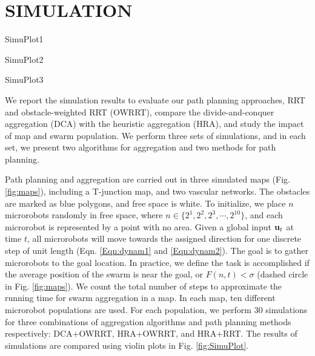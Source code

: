 \section{SIMULATION}\label{Simul}
\begin{figure*}[h] %
	\centering
	\begin{overpic}[width=0.67\columnwidth]{SimuPlot1}\end{overpic}
	\begin{overpic}[width=0.67\columnwidth]{SimuPlot2}\end{overpic}
	\begin{overpic}[width=0.67\columnwidth]{SimuPlot3}\end{overpic}	
	\caption{\label{fig:SimuPlot} Particle aggregation in maps (a,b,c). The violin plot shows the probability density of the simulation data and the black line indicates the mean value. We performed 30 simulations for each combination of methods and swarm populations.}
\end{figure*}
We report the simulation results to evaluate our path planning approaches, RRT and obstacle-weighted RRT (OWRRT), compare the divide-and-conquer aggregation (DCA) with the heuristic aggregation (HRA), and study the impact of map and swarm population. We perform three sets of simulations, and in each set, we present two algorithms for aggregation and two methods for path planning. 






Path planning and aggregation are carried out in three simulated maps (Fig. \ref{fig:maps}), including a T-junction map, and two vascular networks. 
The obstacles are marked as blue polygons, and free space is white. 
To initialize, we place $n$ microrobots randomly in free space, where $n \in \{2^1, 2^2, 2^3, \dotsm, 2^{10}\}$, and each microrobot is represented by a point with no area. 
Given a global input ${\bf u}_t$ at time $t$, all microrobots will move towards the assigned direction for one discrete step of unit length (Eqn. \ref{Eqn:dynam1} and \ref{Eqn:dynam2}). 
The goal is to gather microrobots to the goal location. 
In practice, we define the task is accomplished if the average position of the swarm is near the goal, or $F(n,t) < \sigma$ (dashed circle in Fig. \ref{fig:maps}). 
We count the total number of steps to approximate the running time for swarm aggregation in a map. 
In each map, ten different microrobot populations are used. 
For each population, we perform 30 simulations for three combinations of aggregation algorithms and path planning methods respectively: DCA+OWRRT, HRA+OWRRT, and HRA+RRT. 
The results of simulations are compared using violin plots in Fig. \ref{fig:SimuPlot}.


